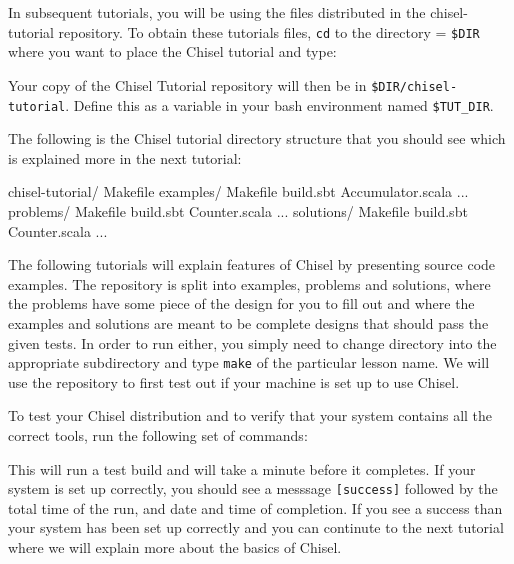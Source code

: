 \documentclass[twocolumn, 10pt]{article}
\begin{document}
In subsequent tutorials, you will be using the files distributed in the chisel-tutorial repository. To obtain these tutorials files, \verb+cd+ to the directory = \verb+$DIR+ where you want to place the Chisel tutorial and type:


\noindent
Your copy of the Chisel Tutorial repository will then be in \verb+$DIR/chisel-tutorial+.  Define this as a variable in your bash environment named \verb+$TUT_DIR+.

The following is the Chisel tutorial directory structure that you should see which is explained more in the next tutorial:

\begin{bash}
chisel-tutorial/  
  Makefile
  examples/
    Makefile
    build.sbt
    Accumulator.scala ...
  problems/
    Makefile
    build.sbt
    Counter.scala ...
  solutions/
    Makefile
    build.sbt
    Counter.scala ...
\end{bash}

\noindent 

The following tutorials will explain features of Chisel by presenting source code examples.  The repository is split into examples, problems and solutions, where the problems have some piece of the design for you to fill out and where the examples and solutions are meant to be complete designs that should pass the given tests.  In order to run either, you simply need to change directory into the appropriate subdirectory and type \verb+make+ of the particular lesson name. We will use the repository to first test out if your machine is set up to use Chisel.

To test your Chisel distribution and to verify that your system contains all the correct tools, run the following set of commands:


This will run a test build and will take a minute before it completes. If your system is set up correctly, you should see a messsage \verb+[success]+ followed by the total time of the run, and date and time of completion. If you see a success than your system has been set up correctly and you can continute to the next tutorial where we will explain more about the basics of Chisel.
\end{document}
